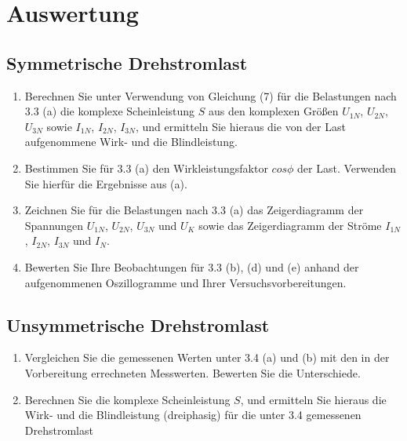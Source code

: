 \section{Auswertung}

\subsection{Symmetrische Drehstromlast }
\begin{enumerate}[label=\alph*)]
	\item Berechnen Sie unter Verwendung von Gleichung (7) für die Belastungen nach 3.3 (a) die komplexe Scheinleistung $S$ aus den komplexen Größen $U_{1N}$, $U_{2N}$, $U_{3N}$ sowie $I_{1N}$, $I_{2N}$, $I_{3N}$, und ermitteln Sie hieraus die von der Last aufgenommene Wirk- und die Blindleistung.
	
	
	
	\item Bestimmen Sie für 3.3 (a) den Wirkleistungsfaktor $cos\phi$ der Last. Verwenden Sie hierfür die Ergebnisse aus (a). 
	
	\item Zeichnen Sie für die Belastungen nach 3.3 (a) das Zeigerdiagramm der Spannungen $U_{1N}$, $U_{2N}$, $U_{3N}$ und $U_{K}$ sowie das Zeigerdiagramm der Ströme $I_{1N}$, $I_{2N}$, $I_{3N}$ und $I_{N}$.
	
	\item Bewerten Sie Ihre Beobachtungen für 3.3 (b), (d) und (e) anhand der aufgenommenen Oszillogramme und Ihrer Versuchsvorbereitungen. 
\end{enumerate}

\subsection{Unsymmetrische Drehstromlast }
\begin{enumerate}[label=\alph*)]
	\item Vergleichen Sie die gemessenen Werten unter 3.4 (a) und (b) mit den in der Vorbereitung errechneten Messwerten. Bewerten Sie die Unterschiede.
	
	\item Berechnen Sie die komplexe Scheinleistung $S$, und ermitteln Sie hieraus die Wirk- und die Blindleistung (dreiphasig) für die unter 3.4 gemessenen Drehstromlast
\end{enumerate}

